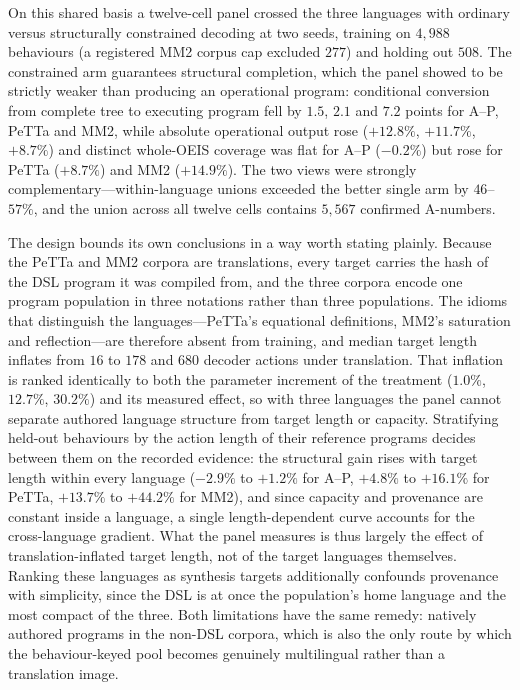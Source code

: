 \documentclass[11pt]{article}
\begin{document}
On this shared basis a twelve-cell panel crossed the three languages with ordinary versus
structurally constrained decoding at two seeds, training on $4{,}988$ behaviours (a
registered MM2 corpus cap excluded $277$) and holding out $508$.  The constrained arm
guarantees structural completion, which the panel showed to be strictly weaker than
producing an operational program: conditional conversion from complete tree to executing
program fell by $1.5$, $2.1$ and $7.2$ points for A--P, PeTTa and MM2, while absolute
operational output rose ($+12.8\%$, $+11.7\%$, $+8.7\%$) and distinct whole-OEIS coverage
was flat for A--P ($-0.2\%$) but rose for PeTTa ($+8.7\%$) and MM2 ($+14.9\%$).  The two
views were strongly complementary---within-language unions exceeded the better single arm
by $46$--$57\%$, and the union across all twelve cells contains $5{,}567$ confirmed
A-numbers.

The design bounds its own conclusions in a way worth stating plainly.  Because the PeTTa
and MM2 corpora are translations, every target carries the hash of the DSL program it was
compiled from, and the three corpora encode one program population in three notations
rather than three populations.  The idioms that distinguish the languages---PeTTa's
equational definitions, MM2's saturation and reflection---are therefore absent from
training, and median target length inflates from $16$ to $178$ and $680$ decoder actions
under translation.  That inflation is ranked identically to both the parameter increment
of the treatment ($1.0\%$, $12.7\%$, $30.2\%$) and its measured effect, so with three
languages the panel cannot separate authored language structure from target length or
capacity.  Stratifying held-out behaviours by the action length of their reference
programs decides between them on the recorded evidence: the structural gain rises with
target length within every language ($-2.9\%$ to $+1.2\%$ for A--P, $+4.8\%$ to $+16.1\%$
for PeTTa, $+13.7\%$ to $+44.2\%$ for MM2), and since capacity and provenance are constant
inside a language, a single length-dependent curve accounts for the cross-language
gradient.  What the panel measures is thus largely the effect of translation-inflated
target length, not of the target languages themselves.  Ranking these languages as
synthesis targets additionally confounds provenance
with simplicity, since the DSL is at once the population's home language and the most
compact of the three.  Both limitations have the same remedy: natively authored programs
in the non-DSL corpora, which is also the only route by which the behaviour-keyed pool
becomes genuinely multilingual rather than a translation image.
\end{document}
